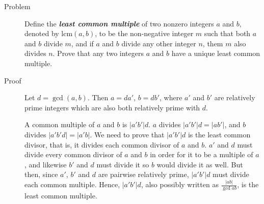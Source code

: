\begin{description}

\item[Problem] Define the \textbf{\textit{least common multiple}} of two
nonzero integers $a$ and $b$, denoted by $\text{lcm}(a, b)$, to be the
non-negative integer $m$ such that both $a$ and $b$ divide $m$, and if $a$ and
$b$ divide any other integer $n$, them $m$ also divides $n$. Prove that any two
integers $a$ and $b$ have a unique least common multiple.

\item[Proof] Let $d = \gcd(a,b)$. Then $a = da'$, $b = db'$, where $a'$ and
$b'$ are relatively prime integers which are also both relatively prime with
$d$.

A common multiple of $a$ and $b$ is $|a'b'|d$. $a$ divides $|a'b'|d = |ab'|$,
and $b$ divides $|a'b'd| = |a'b|$. We need to prove that $|a'b'|d$ is the least
common divisor, that is, it divides each common divisor of $a$ and $b$. $a'$
and $d$ must divide every common divisor of $a$ and $b$ in order for it to be a
multiple of $a$, and likewise $b'$ and $d$ must divide it so $b$ would divide
it as well. But then, since $a'$, $b'$ and $d$ are pairwise relatively prime,
$|a'b'|d$ must divide each common multiple. Hence, $|a'b'|d$, also possibly
written as $\frac{|ab|}{\gcd a b}$, is the least common multiple.

\end{description}
